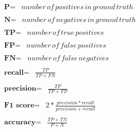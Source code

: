 \begin{align}
\begin{split}
    \textbf{P} ={}& number\,of\,positives\,in\,ground\,truth
\end{split}\\
\begin{split}
    \textbf{N} ={}& number\,of\,negatives\,in\,ground\,truth
\end{split}\\
\begin{split}
    \textbf{TP} ={}& number\,of\,true\,positives
\end{split}\\
\begin{split}
    \textbf{FP} ={}& number\,of\,false\,positives
\end{split}\\
\begin{split}
    \textbf{FN} ={}& number\,of\,false\,negatives
\end{split}\\[1ex]
\begin{split}
    \textbf{recall} ={}& \frac{TP}{TP+FN} \label{eq:results:recall}
\end{split}\\[1ex]
\begin{split}
    \textbf{precision} ={}& \frac{TP}{TP+FP} \label{eq:formulas:precision}
\end{split}\\[1ex]
\begin{split}
    \textbf{F1 score} ={}& 2 * \frac{precision * recall}{precision + recall} \label{eq:formulas:f1}
\end{split}\\[1ex]
\begin{split}
    \textbf{accuracy} ={}& \frac{TP+TN}{P+N} \label{eq:formulas:accuracy}
\end{split}
\end{align}

